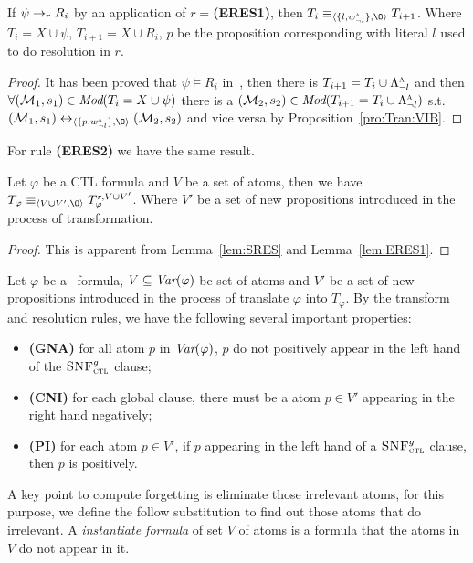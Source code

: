 \documentclass{article}
\begin{document}
\begin{lemma}\label{lem:ERES1}
If $\psi \rightarrow_r R_i$ by an application of $r=$\textbf{(ERES1)},
then $T_i \equiv_{\tuple{\{l, w_{\neg l}^{\ALL}\}, {\O}}} T_{i+1}$.
Where $T_i= X \cup \psi$, $T_{i+1}=X \cup R_i$, $p$ be the proposition corresponding with literal $l$ used to do resolution in $r$.
\end{lemma}
\begin{proof}
 It has been proved that $\psi \models R_i$ in~\cite{bolotov2000clausal}, then there is $T_{i+1}=T_i \cup \Lambda_{\neg l}^{\textsc{a}}$ and  then $\forall ({\cal M}_1,s_1) \in \textit{Mod}(T_i= X \cup \psi)$ there is a $({\cal M}_2, s_2)\in \textit{Mod}(T_{i+1}=T_i \cup \Lambda_{\neg l}^{\textsc{a}})$ s.t. $(\Hm_1, s_1) \lrto_{\tuple{\{p, w_{\neg l}^{\ALL}\}, {\O}}} (\Hm_2, s_2)$ and vice versa by Proposition~\ref{pro:Tran:VIB}.
\end{proof}
For rule \textbf{(ERES2)} we have the same result.

\begin{proposition}
Let $\varphi$ be a CTL formula and $V$ be a set of atoms, then we have $T_{\varphi} \equiv_{\tuple{V \cup V', {\O}}} T_{\varphi}^{r,V \cup V'}$.
Where $V'$ be a set of new propositions introduced in the process of transformation.
\end{proposition}
\begin{proof}
This is apparent from Lemma~\ref{lem:SRES} and Lemma~\ref{lem:ERES1}.
\end{proof}

Let $\varphi$ be a \CTL\ formula, $V \subseteq \textit{Var}(\varphi)$ be set of atoms and $V'$ be a set of new propositions introduced in the process of translate $\varphi$ into $T_{\varphi}$. By the transform and resolution rules, we have the following several important properties:
\begin{itemize}
  \item \textbf{(GNA)} for all atom $p$ in $\textit{Var}(\varphi)$, $p$ do not positively appear in the left hand of the ${\textsc{SNF}_{\textsc{ctl}}^g}$ clause;
  \item \textbf{(CNI)} for each global clause, there must be a atom $p\in V'$ appearing in the right hand negatively;
  \item \textbf{(PI)} for each atom $p\in V'$, if $p$ appearing in the left hand of a ${\textsc{SNF}_{\textsc{ctl}}^g}$ clause, then $p$ is positively.
\end{itemize}


A key point to compute forgetting is eliminate those irrelevant atoms, for this purpose, we define the follow substitution to find out those atoms that do irrelevant. A \emph{instantiate formula} of set $V$ of atoms is a formula that the atoms in $V$ do not appear in it.
\end{document}
